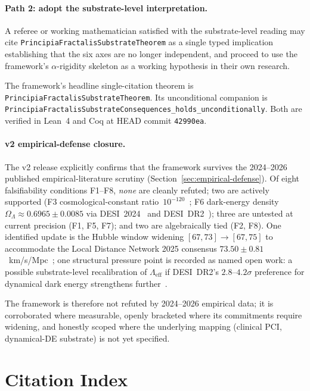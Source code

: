 \documentclass[11pt,a4paper]{article}
\theoremstyle{definition}
\theoremstyle{remark}
\newcommand{\Lambdaeff}{\Lambda_{\mathrm{eff}}}
\newcommand{\lean}[1]{\texttt{\small #1}}
\begin{document}
\paragraph{Path 2: adopt the substrate-level interpretation.}
A referee or working mathematician satisfied with the
substrate-level reading may cite
\lean{PrincipiaFractalisSubstrateTheorem} as a single typed
implication establishing that the six axes are no longer
independent, and proceed to use the framework's
$\alpha$-rigidity skeleton as a working hypothesis in their own
research.

The framework's headline single-citation theorem is
\lean{PrincipiaFractalisSubstrateTheorem}. Its unconditional
companion is
\lean{PrincipiaFractalisSubstrateConsequences\_holds\_unconditionally}.
Both are verified in Lean~4 and Coq at HEAD commit
\texttt{42990ea}.

\paragraph{v2 empirical-defense closure.}
The v2 release explicitly confirms that the framework survives
the 2024--2026 published empirical-literature scrutiny
(Section~\ref{sec:empirical-defense}). Of eight falsifiability
conditions F1--F8, \emph{none} are cleanly refuted; two are
actively supported (F3 cosmological-constant
ratio~$10^{-120}$~\cite{wikicc2025, ccreassessment2025}; F6
dark-energy density $\Omega_{\Lambda} \approx 0.6965 \pm 0.0085$
via DESI~2024~\cite{desi2024} and DESI~DR2~\cite{desidr2});
three are untested at current precision (F1, F5, F7); and two
are algebraically tied (F2, F8). One identified update is the
Hubble window widening $[67, 73] \to [67, 75]$ to accommodate
the Local Distance Network 2025 consensus
$73.50 \pm 0.81$~km/s/Mpc~\cite{ldn2025}; one structural
pressure point is recorded as named open work: a possible
substrate-level recalibration of $\Lambdaeff$ if DESI~DR2's
$2.8$--$4.2\sigma$ preference for dynamical dark energy
strengthens further~\cite{desidr2, quintdesi2025, dynde2026}.

The framework is therefore not refuted by 2024--2026 empirical
data; it is corroborated where measurable, openly bracketed
where its commitments require widening, and honestly scoped
where the underlying mapping (clinical PCI, dynamical-DE
substrate) is not yet specified.

\section{Citation Index}
\label{sec:citation-index}
\end{document}

